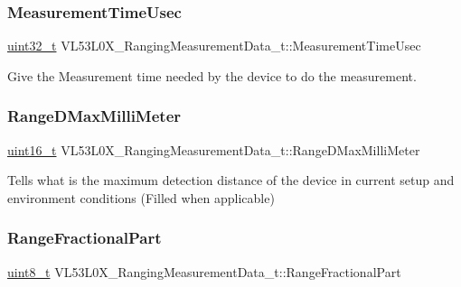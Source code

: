 \subsubsection{\texorpdfstring{Measurement\+Time\+Usec}{MeasurementTimeUsec}}
{\footnotesize\ttfamily \hyperlink{vl53l0x__types_8h_a435d1572bf3f880d55459d9805097f62}{uint32\+\_\+t} V\+L53\+L0\+X\+\_\+\+Ranging\+Measurement\+Data\+\_\+t\+::\+Measurement\+Time\+Usec}

Give the Measurement time needed by the device to do the measurement. \mbox{\label{structVL53L0X__RangingMeasurementData__t_aef435fbf76dda2e46c2f8ab761186af9}} 
\subsubsection{\texorpdfstring{Range\+D\+Max\+Milli\+Meter}{RangeDMaxMilliMeter}}
{\footnotesize\ttfamily \hyperlink{vl53l0x__types_8h_a273cf69d639a59973b6019625df33e30}{uint16\+\_\+t} V\+L53\+L0\+X\+\_\+\+Ranging\+Measurement\+Data\+\_\+t\+::\+Range\+D\+Max\+Milli\+Meter}

Tells what is the maximum detection distance of the device in current setup and environment conditions (Filled when applicable) \mbox{\label{structVL53L0X__RangingMeasurementData__t_ab4d8767fcc285173475916e3d6a1045c}} 
\subsubsection{\texorpdfstring{Range\+Fractional\+Part}{RangeFractionalPart}}
{\footnotesize\ttfamily \hyperlink{vl53l0x__types_8h_aba7bc1797add20fe3efdf37ced1182c5}{uint8\+\_\+t} V\+L53\+L0\+X\+\_\+\+Ranging\+Measurement\+Data\+\_\+t\+::\+Range\+Fractional\+Part}


